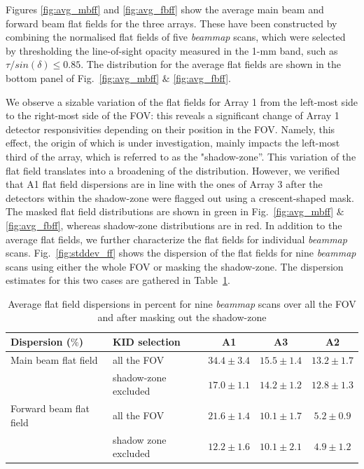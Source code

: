Figures \ref{fig:avg_mbff} and \ref{fig:avg_fbff} show the average main beam and forward beam flat fields for the three arrays. These have been constructed by combining the normalised flat fields of five \emph{beammap} scans, which were selected by thresholding the line-of-sight opacity measured in the 1-mm band, such as $\tau/sin(\delta) \leq 0.85$. The distribution for the average flat fields are shown in the bottom panel of Fig.~\ref{fig:avg_mbff} $\&$ \ref{fig:avg_fbff}.

We observe a sizable variation of the flat fields for Array 1 from the left-most
side to the right-most side of the FOV: this reveals a significant change of
Array 1 detector responsivities depending on their position in the FOV. Namely,
this effect, the origin of which is under investigation, mainly impacts the
left-most third of the array, which is referred to as the "shadow-zone''. This
variation of the flat field translates into a broadening of the
distribution. However, we verified that A1 flat field dispersions are in line
with the ones of Array 3 after the detectors within the shadow-zone were flagged
out using a crescent-shaped mask. The masked flat field distributions are shown
in green in Fig.~\ref{fig:avg_mbff} $\&$ \ref{fig:avg_fbff}, whereas shadow-zone
distributions are in red. In addition to the average flat fields, we further
characterize the flat fields for individual \emph{beammap}
scans. Fig.~\ref{fig:stddev_ff} shows the dispersion of the flat fields for nine
\emph{beammap} scans using either the whole FOV or masking the shadow-zone. The
dispersion estimates for this two cases are gathered in
Table~\ref{tab:flatfields}.

\begin{table}[h]
\begin{center}
\begin{tabular}{|l|l|c|c|c|}
\hline
 Dispersion ($\%$)    & KID selection  &  A1 & A3  & A2 \\
\hline
Main beam flat field  & all the FOV           & $34.4 \pm 3.4$    & $15.5 \pm 1.4$  &  $13.2 \pm 1.7$  \\
                      & shadow-zone excluded  & $17.0 \pm 1.1$    & $14.2 \pm 1.2$  &  $12.8 \pm 1.3$\\
\hline
Forward beam flat field  & all the FOV           & $21.6 \pm 1.4$  & $10.1 \pm 1.7$  & $5.2 \pm 0.9$   \\
                         & shadow zone excluded  & $12.2 \pm 1.6$  & $10.1 \pm 2.1$  & $4.9 \pm 1.2$ \\
\hline
\end{tabular}
\caption[Flat field dispersions]{Average flat field dispersions in percent for nine \emph{beammap} scans over all the FOV and after masking out the shadow-zone}
\end{center}
\label{tab:flatfields}
\end{table}


